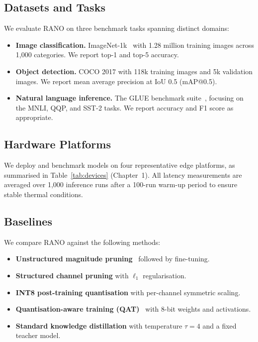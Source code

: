 \documentclass[12pt,a4paper,oneside]{book}
\begin{document}
\subsection{Datasets and Tasks}

We evaluate RANO on three benchmark tasks spanning distinct domains:

\begin{itemize}
  \item \textbf{Image classification.} ImageNet-1k~\cite{goodfellow2016}
  with 1.28 million training images across 1,000 categories. We report
  top-1 and top-5 accuracy.

  \item \textbf{Object detection.} COCO 2017 with 118k training images
  and 5k validation images. We report mean average precision at IoU 0.5
  (mAP@0.5).

  \item \textbf{Natural language inference.} The GLUE benchmark
  suite~\cite{devlin2019bert}, focusing on the MNLI, QQP, and SST-2
  tasks. We report accuracy and F1 score as appropriate.
\end{itemize}

\subsection{Hardware Platforms}

We deploy and benchmark models on four representative edge platforms,
as summarised in Table~\ref{tab:devices} (Chapter~1). All latency
measurements are averaged over 1,000 inference runs after a 100-run
warm-up period to ensure stable thermal conditions.

\subsection{Baselines}

We compare RANO against the following methods:

\begin{itemize}
  \item \textbf{Unstructured magnitude pruning}~\cite{goodfellow2016}
  followed by fine-tuning.
  \item \textbf{Structured channel pruning} with $\ell_1$ regularisation.
  \item \textbf{INT8 post-training quantisation} with per-channel
  symmetric scaling.
  \item \textbf{Quantisation-aware training (QAT)}~\cite{kingma2014adam}
  with 8-bit weights and activations.
  \item \textbf{Standard knowledge distillation} with temperature
  $\tau = 4$ and a fixed teacher model.
\end{itemize}
\end{document}
